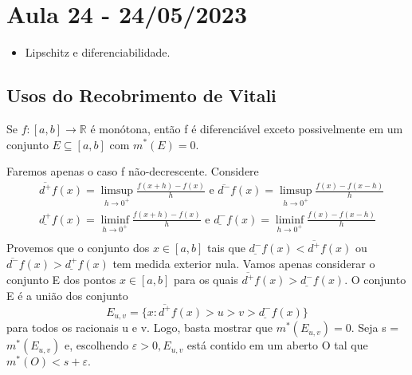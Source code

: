 \documentclass[Analysis/analysis_notes.tex]{subfiles}
\begin{document}
\section{Aula 24 - 24/05/2023}
\begin{itemize}
	\item Lipschitz e diferenciabilidade.
\end{itemize}
\subsection{Usos do Recobrimento de Vitali}
\begin{lemma*}
	Se \(f:[a, b]\rightarrow \mathbb{R}\) é monótona, então f é diferenciável exceto
	possivelmente em um conjunto \(E\subseteq{[a, b]}\) com \(m^{*}(E) = 0\).
\end{lemma*}
\begin{proof*}
	Faremos apenas o caso f não-decrescente. Considere
	\begin{align*}
		 & \overline{d^{+}}f(x) = \limsup_{h\to 0^{+}} \frac{f(x+h)-f(x)}{h}\text{ e }\overline{d^{-}}f(x) = \limsup_{h\to 0^{+}}\frac{f(x) - f(x-h)}{h}   \\
		 & \underline{d^{+}}f(x) = \liminf_{h\to 0^{+}} \frac{f(x+h)-f(x)}{h}\text{ e }\underline{d^{-}}f(x) = \liminf_{h\to 0^{+}}\frac{f(x) - f(x-h)}{h} \\
	\end{align*}
	Provemos que o conjunto dos \(x\in[a, b]\) tais que \(\underline{d^{-}}f(x) < \overline{d^{+}}f(x)\)
	ou \(\overline{d^{-}}f(x) > \underline{d^{+}}f(x)\) tem medida exterior nula.
	Vamos apenas considerar o conjunto E dos pontos \(x\in[a, b]\) para os quais
	\(\overline{d^{+}}f(x) > \underline{d^{-}}f(x).\) O conjunto E é a união
	dos conjunto
	\[
		E_{u, v} = \{x: \overline{d^{+}}f(x) > u > v > \underline{d^{-}}f(x) \}
	\]
	para todos os racionais u e v. Logo, basta mostrar que \(m^{*}(E_{u, v}) = 0.\)
	Seja s = \(m^{*}(E_{u,v })\) e, escolhendo \(\varepsilon >0, E_{u, v}\) está contido
	em um aberto O tal que \(m^{*}(O) < s + \varepsilon .\)


\end{proof*}
\end{document}
